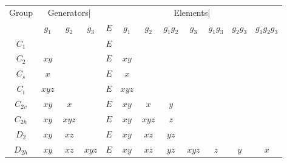 \begin{figure}[h]
\caption{\label{fig:symmetry-input}}
\begin{tabular}{c|ccc|cccccccc|}
Group &
\multicolumn{3}{c}{Generators|} &
\multicolumn{8}{c}{Elements|} \\
         & $g_1$    & $g_2$      & $g_3$ & $E$ &  $g_1$ & $g_2$ & $g_1g_2$ & $g_3$ & $g_1g_3$ & $g_2g_3$ & $g_1g_2g_3$ \\
$C_1$    &          &            &       & $E$ &        &       &          &       &      &      &     \\
$C_2$    & $xy$     &            &       & $E$ & $xy$   &       &          &       &      &      &     \\
$C_s$    & $x$      &            &       & $E$ & $x$    &       &          &       &      &      &     \\
$C_i$    & $xyz$    &            &       & $E$ & $xyz$  &       &          &       &      &      &     \\
$C_{2v}$ & $xy$     & $x$        &       & $E$ & $xy$   & $x$   & $y$      &       &      &      &     \\
$C_{2h}$ & $xy$     & $xyz$      &       & $E$ & $xy$   & $xyz$ & $z$      &       &      &      &     \\
$D_2$    & $xy$     & $xz$       &       & $E$ & $xy$   & $xz$  & $yz$     &       &      &      &     \\
$D_{2h}$ & $xy$     & $xz$       & $xyz$ & $E$ & $xy$   & $xz$  & $yz$     & $xyz$ & $z$  & $y$  & $x$ \\
\end{tabular}
\end{figure}
